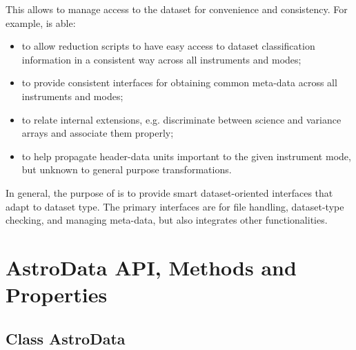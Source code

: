 \documentclass[letterpaper,10pt,english]{sphinxmanual}
\begin{document}
This allows  to manage access to the dataset for convenience
and consistency. For example,  is able:
\begin{itemize}
\item {} 
to allow reduction scripts to have easy access to dataset classification
information in a consistent way across all instruments and modes;

\item {} 
to provide consistent interfaces for obtaining common meta-data across all
instruments and modes;

\item {} 
to relate internal extensions, e.g. discriminate between science and
variance arrays and associate them properly;

\item {} 
to help propagate header-data units important to the given instrument mode,
but unknown to general purpose transformations.

\end{itemize}

In general, the purpose of  is to provide smart dataset-oriented
interfaces that adapt to dataset type. The primary interfaces are for file
handling, dataset-type checking, and managing meta-data, but 
also integrates other functionalities.


\chapter{AstroData API, Methods and Properties}
\label{astro_class:astrodata-api-methods-and-properties}\label{astro_class::doc}

\section{Class AstroData}
\label{astro_class:module-astrodata}\label{astro_class:class-astrodata}
\end{document}
